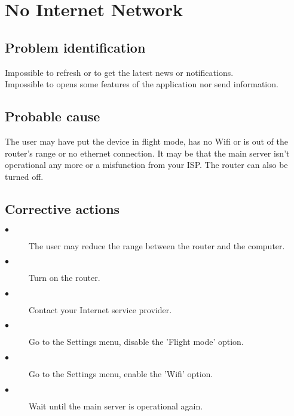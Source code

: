 \section{No Internet Network}

\subsection{Problem identification}
Impossible to refresh or to get the latest news or notifications.\\
Impossible to opens some features of the application nor send information.

\subsection{Probable cause}
The user may have put the device in flight mode, has no Wifi or is out of the
router's range or no ethernet connection. It may be that the main server isn't
operational any more or a misfunction from your ISP. The router can also be
turned off.

\subsection{Corrective actions}
\begin{description} 
\item[$\bullet$] The user may reduce the range between the router and the
computer.
\item[$\bullet$] Turn on the router.
\item[$\bullet$] Contact your Internet service provider.
\item[$\bullet$] Go to the Settings menu, disable the 'Flight mode' option.
\item[$\bullet$] Go to the Settings menu, enable the 'Wifi' option.
\item[$\bullet$] Wait until the main server is operational again.
\end{description} 